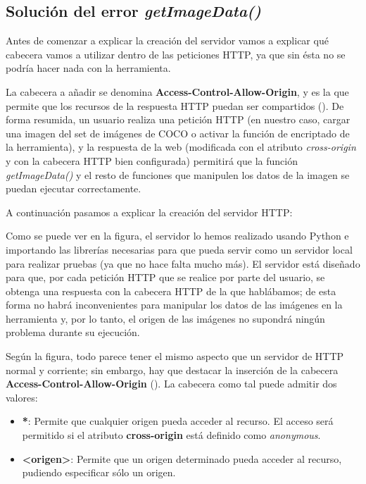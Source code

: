 \subsection{Solución del error \textit{getImageData()}}

Antes de comenzar a explicar la creación del servidor vamos a explicar qué cabecera vamos a utilizar dentro de las peticiones HTTP, ya que sin ésta no se podría hacer nada con la herramienta.

La cabecera a añadir se denomina \textbf{Access-Control-Allow-Origin}, y es la que permite que los recursos de la respuesta HTTP puedan ser compartidos (\cite{access-control-allow-origin}). De forma resumida, un usuario realiza una petición HTTP (en nuestro caso, cargar una imagen del set de imágenes de COCO o activar la función de encriptado de la herramienta), y la respuesta de la web (modificada con el atributo \textit{cross-origin} y con la cabecera HTTP bien configurada) permitirá que la función \textit{getImageData()} y el resto de funciones que manipulen los datos de la imagen se puedan ejecutar correctamente. %

A continuación pasamos a explicar la creación del servidor HTTP:


Como se puede ver en la figura, el servidor lo hemos realizado usando Python e importando las librerías necesarias para que pueda servir como un servidor local para realizar pruebas (ya que no hace falta mucho más). El servidor está diseñado para que, por cada petición HTTP que se realice por parte del usuario, se obtenga una respuesta con la cabecera HTTP de la que hablábamos; de esta forma no habrá inconvenientes para manipular los datos de las imágenes en la herramienta y, por lo tanto, el origen de las imágenes no supondrá ningún problema durante su ejecución.

Según la figura, todo parece tener el mismo aspecto que un servidor de HTTP normal y corriente; sin embargo, hay que destacar la inserción de la cabecera \textbf{Access-Control-Allow-Origin} (\cite{server-http}). La cabecera como tal puede admitir dos valores:

\begin{itemize}
\item \textbf{*}: Permite que cualquier origen pueda acceder al recurso. El acceso será permitido si el atributo \textbf{cross-origin} está definido como \textit{anonymous}.
\item \textbf{<origen>}: Permite que un origen determinado pueda acceder al recurso, pudiendo especificar sólo un origen.
\end{itemize}

